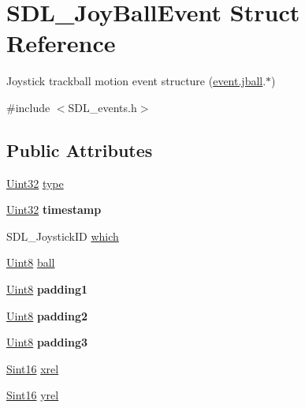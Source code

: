 \hypertarget{structSDL__JoyBallEvent}{}\section{S\+D\+L\+\_\+\+Joy\+Ball\+Event Struct Reference}
\label{structSDL__JoyBallEvent}


Joystick trackball motion event structure (\hyperlink{unionSDL__Event_ae433f511e3383d17f8fe02df745ee8f8}{event.\+jball}.$\ast$)  




{\ttfamily \#include $<$S\+D\+L\+\_\+events.\+h$>$}

\subsection*{Public Attributes}
\begin{DoxyCompactItemize}
\item 
\hyperlink{SDL__stdinc_8h_add440eff171ea5f55cb00c4a9ab8672d}{Uint32} \hyperlink{structSDL__JoyBallEvent_a0b192b95a043cb494b27ed9b27e84db1}{type}
\item 
\hypertarget{structSDL__JoyBallEvent_aa8e4fb91af62e316bb9a3219ab76148d}{}\hyperlink{SDL__stdinc_8h_add440eff171ea5f55cb00c4a9ab8672d}{Uint32} {\bfseries timestamp}\label{structSDL__JoyBallEvent_aa8e4fb91af62e316bb9a3219ab76148d}

\item 
S\+D\+L\+\_\+\+Joystick\+I\+D \hyperlink{structSDL__JoyBallEvent_a4e2e185717d529167cd0bea21093c454}{which}
\item 
\hyperlink{SDL__stdinc_8h_a2944638813a090aa23e62f4da842c3e2}{Uint8} \hyperlink{structSDL__JoyBallEvent_add4eb0daeaf95ae56e8c7cfcec560242}{ball}
\item 
\hypertarget{structSDL__JoyBallEvent_aff75a6519ca2a19cffdc14ebf4626613}{}\hyperlink{SDL__stdinc_8h_a2944638813a090aa23e62f4da842c3e2}{Uint8} {\bfseries padding1}\label{structSDL__JoyBallEvent_aff75a6519ca2a19cffdc14ebf4626613}

\item 
\hypertarget{structSDL__JoyBallEvent_a0ea3071b99ac096b0157714f01ff04f8}{}\hyperlink{SDL__stdinc_8h_a2944638813a090aa23e62f4da842c3e2}{Uint8} {\bfseries padding2}\label{structSDL__JoyBallEvent_a0ea3071b99ac096b0157714f01ff04f8}

\item 
\hypertarget{structSDL__JoyBallEvent_acb700712f1a4070bc114ef9d55b00640}{}\hyperlink{SDL__stdinc_8h_a2944638813a090aa23e62f4da842c3e2}{Uint8} {\bfseries padding3}\label{structSDL__JoyBallEvent_acb700712f1a4070bc114ef9d55b00640}

\item 
\hyperlink{SDL__stdinc_8h_a9d0257032c0e146ab6121bf0122712f5}{Sint16} \hyperlink{structSDL__JoyBallEvent_a959a8473aa1964e5e1778c27a9ffd261}{xrel}
\item 
\hyperlink{SDL__stdinc_8h_a9d0257032c0e146ab6121bf0122712f5}{Sint16} \hyperlink{structSDL__JoyBallEvent_a28ad48a9eb7a5d3ff62ccba09fcead76}{yrel}
\end{DoxyCompactItemize}


